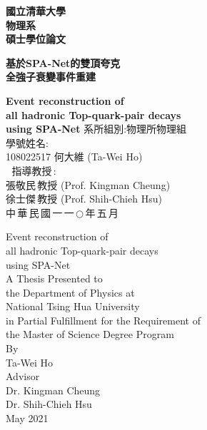 \begin{titlepage}  %
\begin{center}
\Huge
\textbf{國立清華大學\\物理系\\碩士學位論文\\}
\vspace*{1.5in}
\huge
	
\textbf{基於SPA-Net的雙頂夸克\\全強子衰變事件重建}
	
\LARGE
\textbf{Event reconstruction of \\ all hadronic Top-quark-pair decays\\ using SPA-Net}
\vfill
\Large 系所組別:物理所物理組\\
\Large 學號姓名: \\ 108022517 何大維 (Ta-Wei Ho)\\
\Large $\:$$\:$$\,$指導教授$\,$: \\張敬民$\,$教授 (Prof. Kingman Cheung)\\徐士傑$\,$教授 (Prof. Shih-Chieh Hsu) \\ 
\vfill
\Large 中$\,$華$\,$民$\,$國$\,$一$\,$一$\,$$\bigcirc$$\,$年$\,$五$\,$月
\end{center}
\end{titlepage}

\begin{titlepage} %
\begin{center}
\huge {Event reconstruction of\\ all hadronic Top-quark-pair decays\\ using SPA-Net\\}
\vspace*{1.5in}
\large A Thesis Presented to \\the Department of Physics at \\National Tsing Hua University \\in Partial Fulfillment for the Requirement of \\the Master of Science Degree Program\\
\vspace*{2in}
\large By\\Ta-Wei Ho\\
\large Advisor\\Dr. Kingman Cheung\\ Dr. Shih-Chieh Hsu \\
\large May 2021
\end{center}
\end{titlepage}
